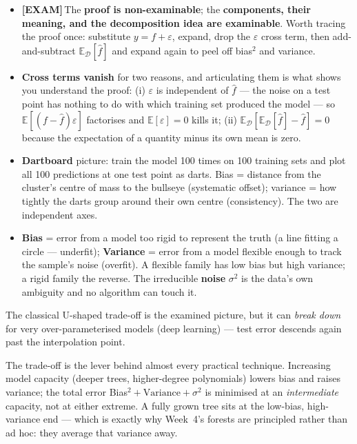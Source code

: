 \documentclass[11pt, a4paper]{article}
\newcommand{\examflag}{\textcolor{tipBd}{\textbf{[EXAM]}}\,}
\newcommand{\kw}[1]{\textbf{#1}}
\begin{document}
\begin{itemize}
  \item \examflag{}The \kw{proof is non-examinable}; the \kw{components, their meaning, and the
  decomposition idea are examinable}. Worth tracing the proof once: substitute $y=f+\varepsilon$,
  expand, drop the $\varepsilon$ cross term, then add-and-subtract $\mathbb E_{\mathcal D}[\hat f]$
  and expand again to peel off bias$^2$ and variance.
  \item \kw{Cross terms vanish} for two reasons, and articulating them is what shows you understand
  the proof: (i) $\varepsilon$ is independent of $\hat f$ — the noise on a test point has nothing to
  do with which training set produced the model — so $\mathbb E[(f-\hat f)\varepsilon]$ factorises and
  $\mathbb E[\varepsilon]=0$ kills it; (ii) $\mathbb E_{\mathcal D}[\mathbb E_{\mathcal D}[\hat f]-\hat f]=0$
  because the expectation of a quantity minus its own mean is zero.
  \item \kw{Dartboard} picture: train the model 100 times on 100 training sets and plot all 100
  predictions at one test point as darts. Bias = distance from the cluster's centre of mass to the
  bullseye (systematic offset); variance = how tightly the darts group around their own centre
  (consistency). The two are independent axes.
  \item \kw{Bias} = error from a model too rigid to represent the truth (a line fitting a circle —
  underfit); \kw{Variance} = error from a model flexible enough to track the sample's noise (overfit).
  A flexible family has low bias but high variance; a rigid family the reverse. The
  irreducible \kw{noise} $\sigma^2$ is the data's own ambiguity and no algorithm can touch it.
\end{itemize}

\begin{pitfallbox}
The classical U-shaped trade-off is the examined picture, but it can \emph{break down} for very
over-parameterised models (deep learning) — test error descends again past the interpolation point.
\end{pitfallbox}

The trade-off is the lever behind almost every practical technique. Increasing model capacity
(deeper trees, higher-degree polynomials) lowers bias and raises variance; the total error
Bias$^2+\text{Variance}+\sigma^2$ is minimised at an \emph{intermediate} capacity, not at either
extreme. A fully grown tree sits at the low-bias, high-variance end — which is exactly why Week~4's
forests are principled rather than ad hoc: they average that variance away.
\end{document}
